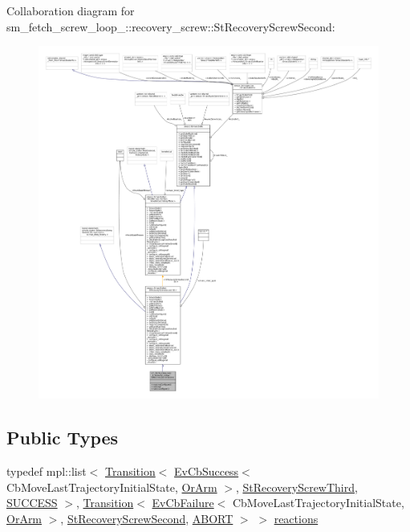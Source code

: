 Collaboration diagram for sm\+\_\+fetch\+\_\+screw\+\_\+loop\+\_\+:\+:recovery\+\_\+screw\+:\+:St\+Recovery\+Screw\+Second\+:
\nopagebreak
\begin{figure}[H]
\begin{center}
\leavevmode
\includegraphics[width=350pt]{structsm__fetch__screw__loop__1_1_1recovery__screw_1_1StRecoveryScrewSecond__coll__graph}
\end{center}
\end{figure}
\subsection*{Public Types}
\begin{DoxyCompactItemize}
\item 
typedef mpl\+::list$<$ \hyperlink{classsmacc_1_1Transition}{Transition}$<$ \hyperlink{structsmacc_1_1EvCbSuccess}{Ev\+Cb\+Success}$<$ Cb\+Move\+Last\+Trajectory\+Initial\+State, \hyperlink{classsm__fetch__screw__loop__1_1_1OrArm}{Or\+Arm} $>$, \hyperlink{structsm__fetch__screw__loop__1_1_1recovery__screw_1_1StRecoveryScrewThird}{St\+Recovery\+Screw\+Third}, \hyperlink{structsmacc_1_1default__transition__tags_1_1SUCCESS}{S\+U\+C\+C\+E\+SS} $>$, \hyperlink{classsmacc_1_1Transition}{Transition}$<$ \hyperlink{structsmacc_1_1EvCbFailure}{Ev\+Cb\+Failure}$<$ Cb\+Move\+Last\+Trajectory\+Initial\+State, \hyperlink{classsm__fetch__screw__loop__1_1_1OrArm}{Or\+Arm} $>$, \hyperlink{structsm__fetch__screw__loop__1_1_1recovery__screw_1_1StRecoveryScrewSecond}{St\+Recovery\+Screw\+Second}, \hyperlink{structsmacc_1_1default__transition__tags_1_1ABORT}{A\+B\+O\+RT} $>$ $>$ \hyperlink{structsm__fetch__screw__loop__1_1_1recovery__screw_1_1StRecoveryScrewSecond_a0bb8f2ceef64dabc619299ff033e97e3}{reactions}
\end{DoxyCompactItemize}

